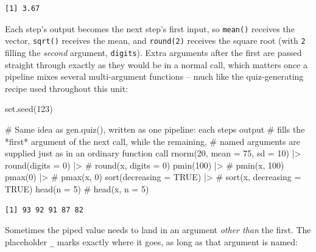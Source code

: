 \documentclass[
  letterpaper,
  DIV=11,
  numbers=noendperiod]{scrreprt}
\newenvironment{Shaded}{\begin{snugshade}}{\end{snugshade}}
\newcommand{\AttributeTok}[1]{\textcolor[rgb]{0.40,0.45,0.13}{#1}}
\newcommand{\CommentTok}[1]{\textcolor[rgb]{0.37,0.37,0.37}{#1}}
\newcommand{\ConstantTok}[1]{\textcolor[rgb]{0.56,0.35,0.01}{#1}}
\newcommand{\DecValTok}[1]{\textcolor[rgb]{0.68,0.00,0.00}{#1}}
\newcommand{\FunctionTok}[1]{\textcolor[rgb]{0.28,0.35,0.67}{#1}}
\newcommand{\NormalTok}[1]{\textcolor[rgb]{0.00,0.23,0.31}{#1}}
\newcommand{\SpecialCharTok}[1]{\textcolor[rgb]{0.37,0.37,0.37}{#1}}
\begin{document}
\begin{verbatim}
[1] 3.67
\end{verbatim}

Each step's output becomes the next step's first input, so
\texttt{mean()} receives the vector, \texttt{sqrt()} receives the mean,
and \texttt{round(2)} receives the square root (with \texttt{2} filling
the \emph{second} argument, \texttt{digits}). Extra arguments after the
first are passed straight through exactly as they would be in a normal
call, which matters once a pipeline mixes several multi-argument
functions -- much like the quiz-generating recipe used throughout this
unit:

\begin{Shaded}
\begin{Highlighting}[]
\FunctionTok{set.seed}\NormalTok{(}\DecValTok{123}\NormalTok{)}

\CommentTok{\# Same idea as gen.quiz(), written as one pipeline: each step\textquotesingle{}s output}
\CommentTok{\# fills the *first* argument of the next call, while the remaining,}
\CommentTok{\# named arguments are supplied just as in an ordinary function call}
\FunctionTok{rnorm}\NormalTok{(}\DecValTok{20}\NormalTok{, }\AttributeTok{mean =} \DecValTok{75}\NormalTok{, }\AttributeTok{sd =} \DecValTok{10}\NormalTok{) }\SpecialCharTok{|\textgreater{}}
    \FunctionTok{round}\NormalTok{(}\AttributeTok{digits =} \DecValTok{0}\NormalTok{) }\SpecialCharTok{|\textgreater{}}       \CommentTok{\# round(x, digits = 0)}
    \FunctionTok{pmin}\NormalTok{(}\DecValTok{100}\NormalTok{) }\SpecialCharTok{|\textgreater{}}                \CommentTok{\# pmin(x, 100)}
    \FunctionTok{pmax}\NormalTok{(}\DecValTok{0}\NormalTok{) }\SpecialCharTok{|\textgreater{}}                  \CommentTok{\# pmax(x, 0)}
    \FunctionTok{sort}\NormalTok{(}\AttributeTok{decreasing =} \ConstantTok{TRUE}\NormalTok{) }\SpecialCharTok{|\textgreater{}}  \CommentTok{\# sort(x, decreasing = TRUE)}
    \FunctionTok{head}\NormalTok{(}\AttributeTok{n =} \DecValTok{5}\NormalTok{)                 }\CommentTok{\# head(x, n = 5)}
\end{Highlighting}
\end{Shaded}

\begin{verbatim}
[1] 93 92 91 87 82
\end{verbatim}

Sometimes the piped value needs to land in an argument \emph{other than}
the first. The placeholder \texttt{\_} marks exactly where it goes, as
long as that argument is named:
\end{document}
